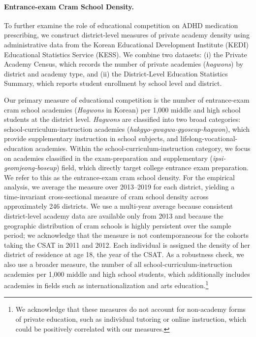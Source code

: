 \documentclass[12pt]{article}
\begin{document}
\paragraph{Entrance-exam Cram School Density.}
To further examine the role of educational competition on ADHD medication prescribing, we construct district-level measures of private academy density using administrative data from the Korean Educational Development Institute (KEDI) Educational Statistics Service (KESS). We combine two datasets: (i) the Private Academy Census, which records the number of private academies (\textit{hagwons}) by district and academy type, and (ii) the District-Level Education Statistics Summary, which reports student enrollment by school level and district.

Our primary measure of educational competition is the number of entrance-exam cram school academies (\textit{Hagwons} in Korean) per 1,000 middle and high school students at the district level. \textit{Hagwons} are classified into two broad categories: school-curriculum-instruction academies (\textit{hakgyo-gwagwa-gyoseup-hagwon}), which provide supplementary instruction in school subjects, and lifelong-vocational-education academies. Within the school-curriculum-instruction category, we focus on academies classified in the exam-preparation and supplementary (\textit{ipsi-geomjeong-boseup}) field, which directly target college entrance exam preparation. We refer to this as the entrance-exam cram school density. For the empirical analysis, we average the measure over 2013--2019 for each district, yielding a time-invariant cross-sectional measure of cram school density across approximately 246 districts. We use a multi-year average because consistent district-level academy data are available only from 2013 and because the geographic distribution of cram schools is highly persistent over the sample period; we acknowledge that the measure is not contemporaneous for the cohorts taking the CSAT in 2011 and 2012. Each individual is assigned the density of her district of residence at age 18, the year of the CSAT. As a robustness check, we also use a broader measure, the number of all school-curriculum-instruction academies per 1,000 middle and high school students, which additionally includes academies in fields such as internationalization and arts education.\footnote{We acknowledge that these measures do not account for non-academy forms of private education, such as individual tutoring or online instruction, which could be positively correlated with our measures.}
\end{document}
